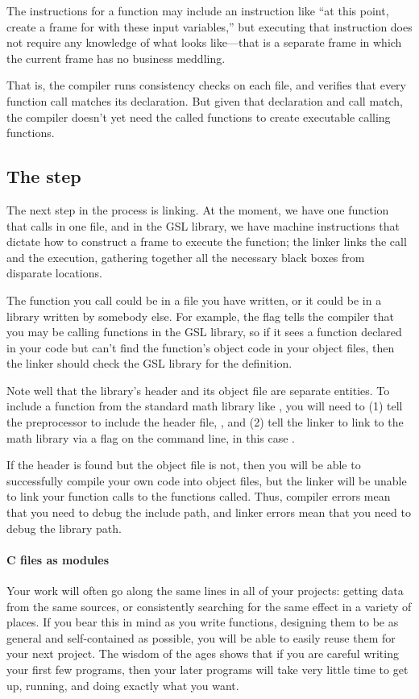 The instructions for a function may include an instruction like ``at this
point, create a frame for  with these input
variables,'' but executing that instruction does not require any knowledge
of what  looks like---that is a separate frame
in which the current frame has no business meddling.

That is, the compiler runs consistency checks on each file, and
verifies that every function call matches its declaration.  But given
that declaration and call match, the compiler doesn't yet need the
called functions to create executable calling functions.


\subsection{The  step}
The next step in the process is linking. At the moment, we have one
function that calls  in one file, and in the
GSL library, we have machine instructions that dictate how to construct
a frame to execute the  function; the linker links
the call and the execution, gathering together all the necessary black
boxes from disparate locations.

The function you call could be in a file you have written, or it could be
in a library written by somebody else.  For example, the 
flag tells the compiler that you may be calling functions in the GSL
library, so if it sees a function declared in your code but can't find
the function's object code in your object files, then the linker should check
the GSL library for the definition.

Note well that the library's header and its object file are separate
entities. To include a function from the standard math library like
, you will need to (1) tell the preprocessor to include the
header file, , and (2) tell the linker to link
to the math library via a  flag on the command line, in this case
.

If the header is found but the object file is not, then you
will be able to successfully compile your own code into object files,
but the linker will be unable to link your function calls to the
functions called. Thus, compiler errors mean that you need to debug the
include path, and linker errors mean that you need to debug the library path.

\paragraph{C files as modules}
Your work will often go along the same lines in all of your projects:
getting data from the same sources, or consistently searching for the
same effect in a variety of places.  If you bear this in mind as you
write functions, designing them to be as general and self-contained
as possible, you will be able to easily reuse them for your next
project. The wisdom of the ages shows that if you are careful writing
your first few programs, then your later programs will take very little
time to get up, running, and doing exactly what you want.

